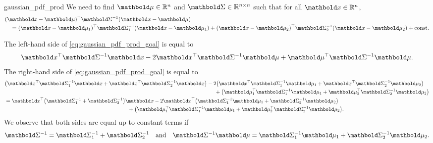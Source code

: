 \begin{solution}{gaussian_pdf_prod}
  We need to find $\vmu \in \R^n$ and $\mSigma \in \R^{n \times n}$ such that for all $\vx \in \R^n$, \begin{align}
    \begin{multlined}[t]
      \transpose{(\vx - \vmu)} \inv{\mSigma} (\vx - \vmu) \nonumber \\ = \transpose{(\vx - \vmu_1)} \inv{\mSigma_1} (\vx - \vmu_1) + \transpose{(\vx - \vmu_2)} \inv{\mSigma_2} (\vx - \vmu_2) + \const.
    \end{multlined}\label{eq:gaussian_pdf_prod_goal}
  \end{align}

  The left-hand side of \cref{eq:gaussian_pdf_prod_goal} is equal to \begin{align*}
    \transpose{\vx} \inv{\mSigma} \vx - 2 \transpose{\vx} \inv{\mSigma} \vmu + \transpose{\vmu} \inv{\mSigma} \vmu.
  \end{align*}
  The right-hand side of \cref{eq:gaussian_pdf_prod_goal} is equal to \begin{align*}
    &\begin{multlined}[t]
      \parentheses*{\transpose{\vx} \inv{\mSigma_1} \vx + \transpose{\vx} \inv{\mSigma_2} \vx} - 2 \parentheses*{\transpose{\vx} \inv{\mSigma_1} \vmu_1 + \transpose{\vx} \inv{\mSigma_2} \vmu_2} \\ + \parentheses*{\transpose{\vmu_1} \inv{\mSigma_1} \vmu_1 + \transpose{\vmu_2} \inv{\mSigma_2} \vmu_2}
    \end{multlined} \\
    &= \begin{multlined}[t]
      \transpose{\vx} \parentheses*{\inv{\mSigma_1} + \inv{\mSigma_2}} \vx - 2 \transpose{\vx} \parentheses*{\inv{\mSigma_1} \vmu_1 + \inv{\mSigma_2} \vmu_2} \\ + \parentheses*{\transpose{\vmu_1} \inv{\mSigma_1} \vmu_1 + \transpose{\vmu_2} \inv{\mSigma_2} \vmu_2}.
    \end{multlined}
  \end{align*}
  We observe that both sides are equal up to constant terms if \begin{align*}
    \inv{\mSigma} = \inv{\mSigma_1} + \inv{\mSigma_2} \quad\text{and}\quad \inv{\mSigma} \vmu = \inv{\mSigma_1} \vmu_1 + \inv{\mSigma_2} \vmu_2.
  \end{align*}
\end{solution}

